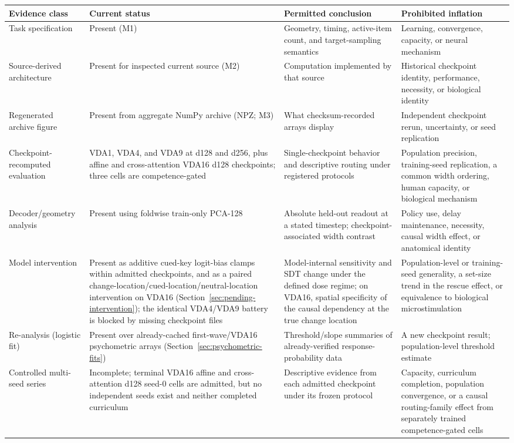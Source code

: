 \documentclass[11pt,a4paper]{article}
\begin{document}
\begingroup\small
\begin{tabularx}{\textwidth}{@{}p{3.5cm}p{2.7cm}Y Y@{}}
\toprule
\textbf{Evidence class} & \textbf{Current status} & \textbf{Permitted conclusion} & \textbf{Prohibited inflation}\\
\midrule
Task specification & Present (M1) & Geometry, timing, active-item count, and target-sampling semantics & Learning, convergence, capacity, or neural mechanism\\
Source-derived architecture & Present for inspected current source (M2) & Computation implemented by that source & Historical checkpoint identity, performance, necessity, or biological identity\\
Regenerated archive figure & Present from aggregate NumPy archive (NPZ; M3) & What checksum-recorded arrays display & Independent checkpoint rerun, uncertainty, or seed replication\\
Checkpoint-recomputed evaluation & VDA1, VDA4, and VDA9 at d128 and d256, plus affine and cross-attention VDA16 d128 checkpoints; three cells are competence-gated & Single-checkpoint behavior and descriptive routing under registered protocols & Population precision, training-seed replication, a common width ordering, human capacity, or biological mechanism\\
Decoder/geometry analysis & Present using foldwise train-only PCA-128 & Absolute held-out readout at a stated timestep; checkpoint-associated width contrast & Policy use, delay maintenance, necessity, causal width effect, or anatomical identity\\
Model intervention & Present as additive cued-key logit-bias clamps within admitted checkpoints, and as a paired change-location/cued-location/neutral-location intervention on VDA16 (Section~\ref{sec:pending-intervention}); the identical VDA4/VDA9 battery is blocked by missing checkpoint files & Model-internal sensitivity and SDT change under the defined dose regime; on VDA16, spatial specificity of the causal dependency at the true change location & Population-level or training-seed generality, a set-size trend in the rescue effect, or equivalence to biological microstimulation\\
Re-analysis (logistic fit) & Present over already-cached first-wave/VDA16 psychometric arrays (Section~\ref{sec:psychometric-fits}) & Threshold/slope summaries of already-verified response-probability data & A new checkpoint result; population-level threshold estimate\\
Controlled multi-seed series & Incomplete; terminal VDA16 affine and cross-attention d128 seed-0 cells are admitted, but no independent seeds exist and neither completed curriculum & Descriptive evidence from each admitted checkpoint under its frozen protocol & Capacity, curriculum completion, population convergence, or a causal routing-family effect from separately trained competence-gated cells\\
\bottomrule
\end{tabularx}
\endgroup
\end{document}

